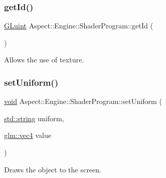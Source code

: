 \subsubsection{\texorpdfstring{get\+Id()}{getId()}}
{\footnotesize\ttfamily \mbox{\hyperlink{glew_8h_a68c4714e43d8e827d80759f9cb864f3c}{G\+Luint}} Aspect\+::\+Engine\+::\+Shader\+Program\+::get\+Id (\begin{DoxyParamCaption}{ }\end{DoxyParamCaption})}



Allows the use of texture. 

\mbox{\label{class_aspect_1_1_engine_1_1_shader_program_aefda3028d33a268999baca3a953d0ac8}} 
\subsubsection{\texorpdfstring{set\+Uniform()}{setUniform()}\hspace{0.1cm}{\footnotesize\ttfamily [1/4]}}
{\footnotesize\ttfamily \mbox{\hyperlink{_s_d_l__opengles2__gl2ext_8h_ae5d8fa23ad07c48bb609509eae494c95}{void}} Aspect\+::\+Engine\+::\+Shader\+Program\+::set\+Uniform (\begin{DoxyParamCaption}\item[{\mbox{\hyperlink{_s_d_l__opengl__glext_8h_ae84541b4f3d8e1ea24ec0f466a8c568b}{std\+::string}}}]{uniform,  }\item[{\mbox{\hyperlink{group__core__types_ga5881b1b022d7fd1b7218f5916532dd02}{glm\+::vec4}}}]{value }\end{DoxyParamCaption})}



Draws the object to the screen. 

\mbox{\label{class_aspect_1_1_engine_1_1_shader_program_ac294314ed82949d84ad00deeffba56bd}} 
